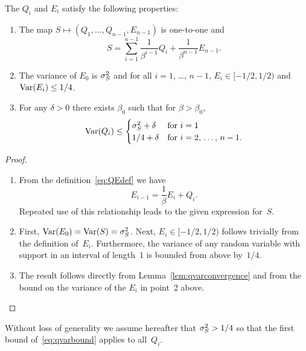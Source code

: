 \begin{proposition}
  \label{prop:qeproperties}
  The $Q_i$ and $E_i$ satisfy the following properties:
\begin{enumerate}
  \item The map $S \mapsto (Q_1, \dots, Q_{n-1}, E_{n-1})$ is one-to-one and
    \begin{equation}
      \label{eq:unwraprec}
      S = \sum_{i=1}^{n-1} \frac{1}{\beta^{i-1}} Q_i + \frac{1}{\beta^{n-1}}
      E_{n-1}.
    \end{equation}

  \item The variance of $E_0$ is ${\sigma_S^2}$ and for all $i = 1$, \dots, $n-1$, $E_i
    \in [-1/2, 1/2)$ and $\operatorname{Var}(E_i) \le 1/4$.
  \item For any $\delta > 0$ there exists $\beta_0$ such that for $\beta
    > \beta_0$,
    \begin{equation}
      \label{eq:qvarbound}
      \operatorname{Var}(Q_i) \le
      \begin{cases}
        {\sigma_S^2} + \delta & \text{for $i = 1$} \\
        1/4 + \delta & \text{for $i = 2$, \dots, $n-1$.}
      \end{cases}
    \end{equation}
\end{enumerate}
\end{proposition}

\goodbreak
\begin{proof}
  \begin{enumerate}
    \item From the definition~\eqref{eq:QEdef} we have
    \begin{equation}
      \label{eq:reverserec}
      E_{i-1} = \frac{1}{\beta} E_i + Q_i.
    \end{equation}
    Repeated use of this relationship leads to the given expression for~$S$. 
  \item First, $\operatorname{Var}(E_0) = \operatorname{Var}(S) = {\sigma_S^2}$. Next, $E_i \in [-1/2, 1/2)$ follows
    trivially from the definition of~$E_i$.  Furthermore, the variance of any
    random variable with support in an interval of length~$1$ is bounded from
    above by~$1/4$. 
  \item The result follows directly from Lemma~\ref{lem:qvarconvergence} and
    from the bound on the variance of the $E_i$ in point~2 above.
  \end{enumerate}
\end{proof}

Without loss of generality we assume hereafter that ${\sigma_S^2} > 1/4$ so that the
first bound of~\eqref{eq:qvarbound} applies to all~$Q_i$.


